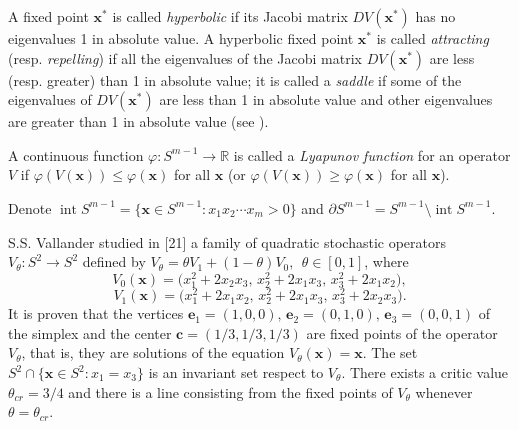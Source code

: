 \documentclass[11pt,reqno]{amsart}
\numberwithin{equation}{section} \setcounter{tocdepth}{1}
\DeclareMathOperator{\inte}{int}
\begin{document}
A fixed point $\mathbf{x}^*$ is called \emph{hyperbolic} if its Jacobi matrix $D V (\mathbf{x}^*)$ has no eigenvalues 1
in absolute value. A hyperbolic fixed point $\mathbf{x}^*$ is called \emph{attracting} (resp. \emph{repelling}) if all
the eigenvalues of the Jacobi matrix $D V (\mathbf{x}^*)$ are less (resp. greater) than 1 in absolute
value; it is called a  \emph{saddle} if some of the eigenvalues of $D V (\mathbf{x}^*)$ are less than 1 in absolute
value and other eigenvalues are greater than 1 in absolute value (see \cite{Dev}).

A continuous function $\varphi \colon S^{m-1} \to \mathbb{R}$ is called a \emph{Lyapunov function} for an operator $V$ if
$\varphi(V (\mathbf{x})) \leq \varphi(\mathbf{x})$ for all $\mathbf{x}$ (or $\varphi(V (\mathbf{x})) \geq \varphi(\mathbf{x})$ for all $\mathbf{x}$).

Denote $\inte S^{m-1} = \{\mathbf{x}\in S^{m-1} : x_1x_2\cdots x_m > 0\}$ and $\partial S^{m-1} = S^{m-1}\setminus  \inte S^{m-1}$.

S.S. Vallander  studied in [21] a family of quadratic stochastic operators $V_\theta \colon S^2 \to S^2$ defined
by $V_\theta = \theta V_1 + (1 -\theta)V_0, \ \ \theta \in [0, 1]$, where
\[V_0(\mathbf{x}) = \big(x^2_1+ 2x_2x_3, \,  x^2_2+ 2x_1x_3, \,  x^2_3 + 2x_1x_2\big),\]
\[V_1(\mathbf{x}) = \big(x^2_1+ 2x_1x_2, \,  x^2_2+ 2x_1x_3, \,  x^2_3 + 2x_2x_3\big).\]
It is proven that the vertices $\mathbf{e}_1 = (1, 0, 0), \, \mathbf{e}_2 = (0, 1, 0), \, \mathbf{e}_3 = (0, 0, 1)$ of the simplex and the
center $\mathbf{c} = (1/3,1/3,1/3)$ are fixed points of the operator $V_\theta$, that is, they are solutions of the equation
$V_\theta(\mathbf{x}) =\mathbf{x}$. The set $S^2 \cap \{\mathbf{x}\in S^2 : x_1 = x_3\}$ is an invariant set respect to $V_\theta$. There exists a
critic value $\theta_{cr} = 3/4$ and there is a line consisting from the fixed points of $V_\theta$ whenever
$\theta = \theta_{cr}$.
\end{document}
